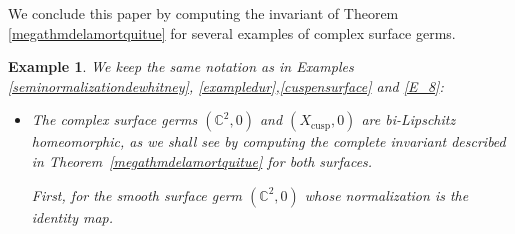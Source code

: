 \documentclass[reqno,dvipsnames,12pt]{amsart}
\newtheorem{exam}[thm]{Example}
\begin{document}
We conclude this paper by computing the invariant of Theorem \ref{megathmdelamortquitue} for several  examples of complex surface germs.
\begin{exam}\label{application2} We keep the same notation as in Examples \ref{seminormalizationdewhitney}, \ref{exampledur},\ref{cuspensurface} and \ref{E_8}:
    \begin{itemize}
        \item The complex surface germs $(\mathbb{C}^2,0)$ and $(X_{\mathrm{cusp}},0)$ are bi-Lipschitz homeomorphic, as we shall see by computing the complete invariant described in Theorem~\ref{megathmdelamortquitue} for both surfaces. 

First, for the smooth surface germ $(\mathbb{C}^2,0)$ whose normalization is the identity map. \begin{figure}[H]
   \centering
{}
\end{figure}
\end{itemize}
\end{exam}
\end{document}
